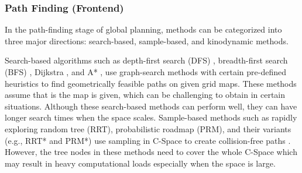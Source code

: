 \documentclass[letterpaper,journal,twoside]{IEEEtran}
\begin{document}
\subsubsection{Path Finding (Frontend)}

In the path-finding stage of global planning, 
methods can be categorized 
into three major directions: {search-based}, 
{sample-based}, and {kinodynamic} methods. 


% 
{Search-based} algorithms such as depth-first 
search (DFS) \cite{cormen2022introduction}, 
breadth-first search (BFS) \cite{cormen2022introduction}, 
Dijkstra \cite{wang2011application}, and 
A* \cite{hart1968formal}, use graph-search methods 
with certain pre-defined heuristics to find 
geometrically feasible paths on given grid maps. 
These methods assume that 
is the map is given, which can be challenging to obtain
in certain situations. 
Although these search-based methods can perform well, they 
can have longer search times when the space scales.
{Sample-based} methods such as rapidly exploring random 
tree (RRT), probabilistic roadmap (PRM), and their 
variants (e.g., RRT* and PRM*) use sampling in C-Space 
to create collision-free paths \cite{lavalle2001rapidly,
karaman2011sampling,kavraki1996probabilistic}. 
% 
However, the tree nodes in these methods need to cover the 
whole C-Space which may result in heavy computational 
loads especially when the space is large.  
\end{document}
